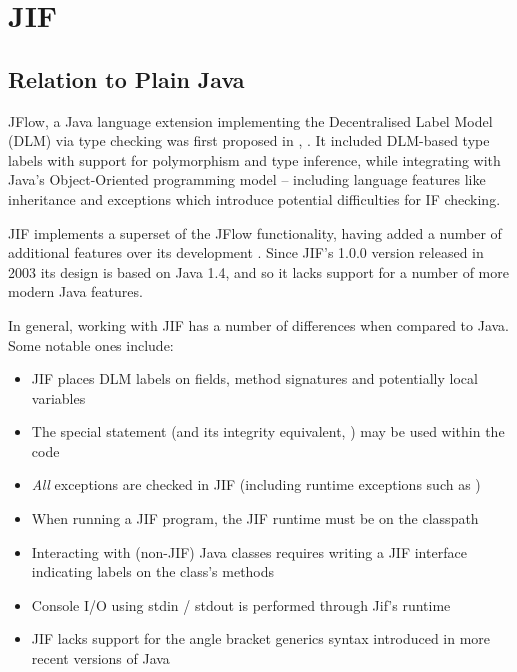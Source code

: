 

\section{JIF}

\subsection{Relation to Plain Java}

JFlow, a Java language extension implementing the Decentralised Label Model (DLM) via type checking was first proposed in , \cite{myers1999jflow}. It included DLM-based type labels with support for polymorphism and type inference, while integrating with Java's Object-Oriented programming model -- including language features like inheritance and exceptions which introduce potential difficulties for IF checking.

JIF implements a superset of the JFlow functionality, having added a number of additional features over its development \cite{jifwebsite}. Since JIF's 1.0.0 version released in 2003 its design is based on Java 1.4, and so it lacks support for a number of more modern Java features.

In general, working with JIF has a number of differences when compared to Java. Some notable ones include:

\begin{itemize}
	\item JIF places DLM labels on fields, method signatures and potentially local variables
	
	\item The special  statement (and its integrity equivalent, ) may be used within the code
	
	\item \textit{All} exceptions are checked in JIF (including runtime exceptions such as )
	
	\item When running a JIF program, the JIF runtime must be on the classpath
	
	\item Interacting with (non-JIF) Java classes requires writing a JIF interface indicating labels on the class's methods
	
	\item Console I/O using stdin / stdout is performed through Jif's runtime
	
	\item JIF lacks support for the angle bracket generics syntax introduced in more recent versions of Java
\end{itemize}

